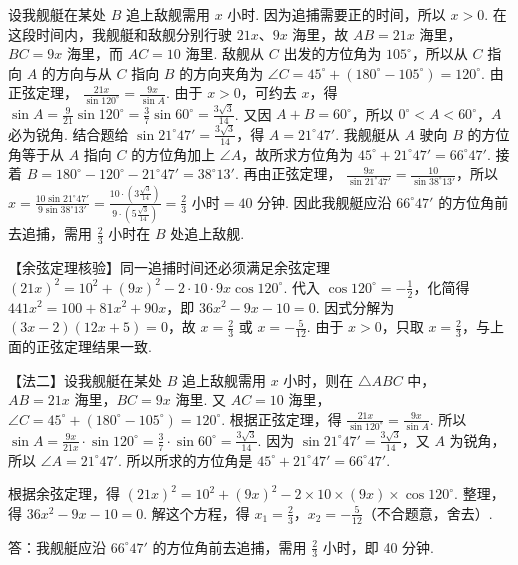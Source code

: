 \begin{solution}
设我舰艇在某处 \(B\) 追上敌舰需用 \(x\) 小时. 因为追捕需要正的时间，所以 \(x>0\). 在这段时间内，我舰艇和敌舰分别行驶 \(21x\)、\(9x\) 海里，故
\(AB=21x\text{ 海里}\)，\(BC=9x\text{ 海里}\)，而 \(AC=10\text{ 海里}\). 敌舰从 \(C\) 出发的方位角为 \(105^\circ\)，所以从 \(C\) 指向 \(A\) 的方向与从 \(C\) 指向 \(B\) 的方向夹角为
\(\angle C=45^\circ+(180^\circ-105^\circ)=120^\circ\).
由正弦定理，
\(\frac{21x}{\sin120^\circ}=\frac{9x}{\sin A}\). 由于 \(x>0\)，可约去 \(x\)，得
\(\sin A=\frac{9}{21}\sin120^\circ=\frac37\sin60^\circ=\frac{3\sqrt3}{14}\). 又因
\(A+B=60^\circ\)，所以 \(0^\circ<A<60^\circ\)，\(A\) 必为锐角. 结合题给
\(\sin21^\circ47'=\frac{3\sqrt3}{14}\)，得 \(A=21^\circ47'\). 我舰艇从 \(A\) 驶向 \(B\) 的方位角等于从 \(A\) 指向 \(C\) 的方位角加上 \(\angle A\)，故所求方位角为
\(45^\circ+21^\circ47'=66^\circ47'\).
接着 \(B=180^\circ-120^\circ-21^\circ47'=38^\circ13'\). 再由正弦定理，
\(\frac{9x}{\sin21^\circ47'}=\frac{10}{\sin38^\circ13'}\)，所以
\(x=\frac{10\sin21^\circ47'}{9\sin38^\circ13'}=\frac{10\cdot(3\frac{\sqrt3}{14})}{9\cdot(5\frac{\sqrt3}{14})}=\frac23\text{ 小时}=40\text{ 分钟}\).
因此我舰艇应沿 \(66^\circ47'\) 的方位角前去追捕，需用 \(\frac23\) 小时在 \(B\) 处追上敌舰.

【余弦定理核验】同一追捕时间还必须满足余弦定理
\((21x)^2=10^2+(9x)^2-2\cdot10\cdot9x\cos120^\circ\). 代入 \(\cos120^\circ=-\frac12\)，化简得
\(441x^2=100+81x^2+90x\)，即 \(36x^2-9x-10=0\). 因式分解为
\((3x-2)(12x+5)=0\)，故 \(x=\frac23\) 或 \(x=-\frac5{12}\). 由于 \(x>0\)，只取 \(x=\frac23\)，与上面的正弦定理结果一致.

【法二】设我舰艇在某处 \(B\) 追上敌舰需用 \(x\) 小时，则在 \(\triangle ABC\) 中，
\( AB=21x\text{ 海里} \)，\( BC=9x\text{ 海里} \).
又 \( AC=10\text{ 海里} \)，
\( \angle C=45^\circ+\left( 180^\circ-105^\circ \right)=120^\circ \).
根据正弦定理，得
\( \frac{21x}{\sin 120^\circ}=\frac{9x}{\sin A} \).
所以
\(\sin A=\frac{9x}{21x}\cdot \sin 120^\circ=\frac{3}{7}\cdot \sin 60^\circ=\frac{3\sqrt{3}}{14}\).
因为 \( \sin 21^\circ47'=\frac{3\sqrt{3}}{14} \)，又 \(A\) 为锐角，所以 \( \angle A=21^\circ47' \).
所以所求的方位角是 \( 45^\circ+21^\circ47'=66^\circ47' \).

根据余弦定理，得
\( \left( 21x \right)^2=10^2+\left( 9x \right)^2-2\times 10\times \left( 9x \right)\times \cos 120^\circ \).
整理，得
\( 36x^2-9x-10=0 \).
解这个方程，得
\( x_1=\frac{2}{3} \)，\( x_2=-\frac{5}{12} \)（不合题意，舍去）.

答：我舰艇应沿 \(66^\circ47'\) 的方位角前去追捕，需用 \(\frac23\) 小时，即 40 分钟.


\end{solution}
